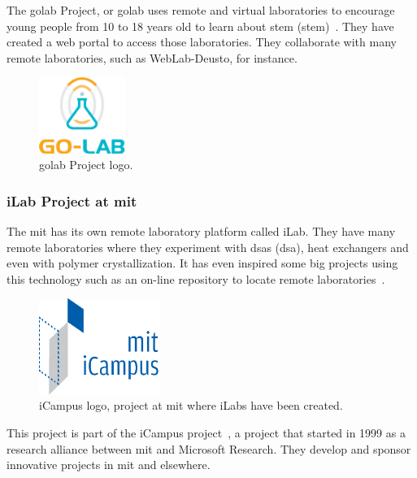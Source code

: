 The \acrshort{golab} Project, or \acrlong{golab} uses remote and virtual laboratories to encourage
young people from 10 to 18 years old to learn about \acrlong{stem}
(\acrshort{stem})~\cite{golab_web}. They have created a web portal to access those laboratories.
They collaborate with many remote laboratories, such as WebLab-Deusto, for instance.

\begin{figure}[!htbp]
	\centering
	\includegraphics[width=0.25\textwidth]{fig/golab}
	\caption{\acrshort{golab} Project logo.}
\end{figure}

\subsubsection{iLab Project at \acrshort{mit}}

The \acrlong{mit} has its own remote laboratory platform called iLab. They have many remote
laboratories where they experiment with \acrlong{dsa}s (\acrshort{dsa}), heat exchangers and even
with polymer crystallization. It has even inspired some big projects using this technology such as
an on-line repository to locate remote laboratories~\cite{ilabs_multi}.

\begin{figure}[!htbp]
	\centering
	\includegraphics[width=0.35\textwidth]{fig/icampus.eps}
	\caption{iCampus logo, project at \acrshort{mit} where iLabs have been created.}
\end{figure}

This project is part of the iCampus project~\cite{icampus_web}, a project that started in 1999 as a
research alliance between \acrshort{mit} and Microsoft Research. They develop and sponsor innovative
projects in \acrshort{mit} and elsewhere.

